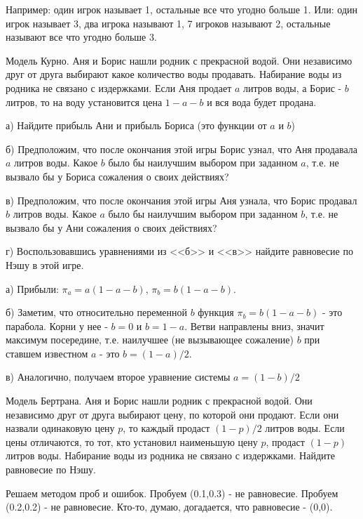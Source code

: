 \documentclass[pdftex,12pt,a4paper]{article}
\begin{document}
\vspace{10pt}
Например: один игрок называет 1, остальные все что угодно больше 1. Или: один игрок называет 3, два игрока называют 1, 7 игроков называют 2, остальные называют все что угодно больше 3.




\vspace{10pt}
Модель Курно. Аня и Борис нашли родник с прекрасной водой. Они независимо друг от друга выбирают какое количество воды продавать. Набирание воды из родника не связано с издержками. Если Аня продает $a$ литров воды, а Борис - $b$ литров, то на воду установится цена $1-a-b$ и вся вода будет продана.

а) Найдите прибыль Ани и прибыль Бориса (это функции от $a$ и $b$)

б) Предположим, что после окончания этой игры Борис узнал, что Аня продавала $a$ литров воды. Какое $b$ было бы наилучшим выбором при заданном $a$, т.е. не вызвало бы у Бориса сожаления о своих действиях?

в) Предположим, что после окончания этой игры Аня узнала, что Борис продавал $b$ литров воды. Какое $a$ было бы наилучшим выбором при заданном $b$, т.е. не вызвало бы у Ани сожаления о своих действиях?

г) Воспользовавшись уравнениями из <<б>> и <<в>> найдите равновесие по Нэшу в этой игре.

\vspace{10pt}
а) Прибыли: $\pi_{a}=a(1-a-b)$, $\pi_{b}=b(1-a-b)$. 

б) Заметим, что относительно переменной $b$ функция $\pi_{b}=b(1-a-b)$ - это парабола. Корни у нее - $b=0$ и $b=1-a$. Ветви направлены вниз, значит максимум посередине, т.е. наилучшее (не вызывающее сожаление) $b$ при ставшем известном $a$ - это $b=(1-a)/2$.

в) Аналогично, получаем второе уравнение системы $a=(1-b)/2$




\vspace{10pt}
Модель Бертрана. Аня и Борис нашли родник с прекрасной водой. Они независимо друг от друга выбирают цену, по которой они продают. Если они назвали одинаковую цену $p$, то каждый продаст $(1-p)/2$ литров воды. Если цены отличаются, то тот, кто установил наименьшую цену $p$, продаст $(1-p)$ литров воды. Набирание воды из родника не связано с издержками. Найдите равновесие по Нэшу.

\vspace{10pt}
Решаем методом проб и ошибок. Пробуем (0.1,0.3) - не равновесие. Пробуем (0.2,0.2) - не равновесие. Кто-то, думаю, догадается, что равновесие - (0,0).
\end{document}
